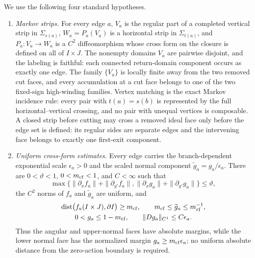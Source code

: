 \documentclass[11pt]{amsart}
\numberwithin{equation}{section}
\theoremstyle{definition}
\theoremstyle{remark}
\begin{document}
We use the following four standard hypotheses.
\begin{enumerate}
\renewcommand{\labelenumi}{\textup{(\roman{enumi})}}
\item \emph{Markov strips.}  For every edge $a$, $V_a$ is the regular part of a
completed vertical strip in
$\Sigma_{s(a)}$, $W_a=P_a(V_a)$ is a horizontal strip in $\Sigma_{t(a)}$, and
$P_a:V_a\to W_a$ is a $C^2$ diffeomorphism whose cross form on the closure is
defined on all of $I\times J$.  The nonempty domains $V_a$ are pairwise disjoint,
and the labeling is faithful: each connected return-domain component occurs
as exactly one edge.  The family $\{V_a\}$ is locally finite away from the
two removed cut faces, and every accumulation at a cut face belongs to one
of the two fixed-sign high-winding families.  Vertex matching is the exact Markov
incidence rule: every pair with $t(a)=s(b)$ is represented by the full
horizontal--vertical crossing, and no pair with unequal vertices is
composable.  A closed strip before cutting may cross a removed ideal face
only before the edge set is defined: its regular sides are separate edges and
the intervening face belongs to exactly one first-exit component.

\item \emph{Uniform cross-form estimates.}  Every edge carries the branch-dependent exponential scale
$\epsilon_a>0$ and the scaled normal component
$\widetilde g_a=g_a/\epsilon_a$.  There are $0<\vartheta<1$,
$0<m_{\rm cf}<1$, and $C<\infty$ such that
\begin{equation}\label{eq:CT1}
 \max\{\|\partial_xf_a\|+\|\partial_{y'}f_a\|,
       \|\partial_xg_a\|+\|\partial_{y'}g_a\|\}
 \le\vartheta,
\end{equation}
the $C^2$ norms of $f_a$ and $\widetilde g_a$ are uniform, and
\begin{equation}\label{eq:CT1-seam}
 \begin{gathered}
  \operatorname{dist}\bigl(f_a(I\times J),\partial I\bigr)\ge m_{\rm cf},
  \qquad m_{\rm cf}\le\widetilde g_a\le m_{\rm cf}^{-1},\\
  0<g_a\le1-m_{\rm cf},
  \qquad \|Dg_a\|_{C^1}\le C\epsilon_a.
 \end{gathered}
\end{equation}
Thus the angular and upper-normal faces have absolute margins, while the
lower normal face has the normalized margin
$g_a\ge m_{\rm cf}\epsilon_a$; no uniform absolute distance from the
zero-action boundary is
required.


\end{enumerate}
\end{document}
